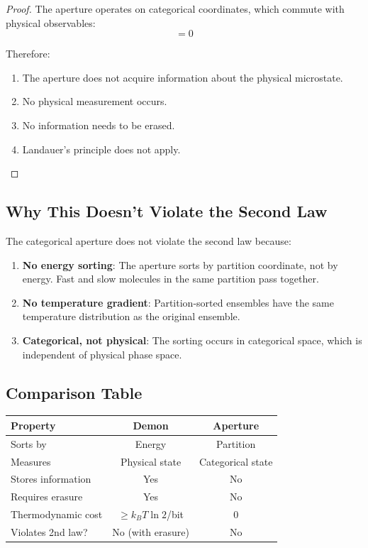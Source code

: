 \begin{proof}
The aperture operates on categorical coordinates, which commute with physical observables:
\begin{equation}
    [\hat{O}_{\text{cat}}, \hat{O}_{\text{phys}}] = 0
\end{equation}

Therefore:
\begin{enumerate}
    \item The aperture does not acquire information about the physical microstate.
    \item No physical measurement occurs.
    \item No information needs to be erased.
    \item Landauer's principle does not apply.
\end{enumerate}
\end{proof}

\subsection{Why This Doesn't Violate the Second Law}

The categorical aperture does not violate the second law because:

\begin{enumerate}
    \item \textbf{No energy sorting}: The aperture sorts by partition coordinate, not by energy. Fast and slow molecules in the same partition pass together.

    \item \textbf{No temperature gradient}: Partition-sorted ensembles have the same temperature distribution as the original ensemble.

    \item \textbf{Categorical, not physical}: The sorting occurs in categorical space, which is independent of physical phase space.
\end{enumerate}

\subsection{Comparison Table}

\begin{center}
\begin{tabular}{lcc}
\toprule
Property & Demon & Aperture \\
\midrule
Sorts by & Energy & Partition \\
Measures & Physical state & Categorical state \\
Stores information & Yes & No \\
Requires erasure & Yes & No \\
Thermodynamic cost & $\geq k_B T \ln 2$/bit & 0 \\
Violates 2nd law? & No (with erasure) & No \\
\bottomrule
\end{tabular}
\end{center}


